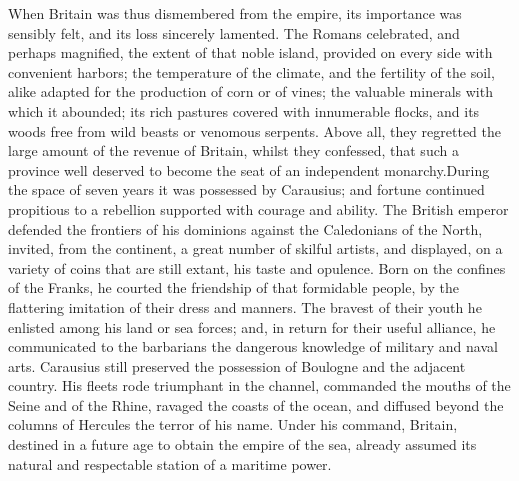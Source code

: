 
When Britain was thus dismembered from the empire, its importance
was sensibly felt, and its loss sincerely lamented. The Romans
celebrated, and perhaps magnified, the extent of that noble
island, provided on every side with convenient harbors; the
temperature of the climate, and the fertility of the soil, alike
adapted for the production of corn or of vines; the valuable
minerals with which it abounded; its rich pastures covered with
innumerable flocks, and its woods free from wild beasts or
venomous serpents. Above all, they regretted the large amount of
the revenue of Britain, whilst they confessed, that such a
province well deserved to become the seat of an independent
monarchy.\footnotemark[27] During the space of seven years it was possessed by
Carausius; and fortune continued propitious to a rebellion
supported with courage and ability. The British emperor defended
the frontiers of his dominions against the Caledonians of the
North, invited, from the continent, a great number of skilful
artists, and displayed, on a variety of coins that are still
extant, his taste and opulence. Born on the confines of the
Franks, he courted the friendship of that formidable people, by
the flattering imitation of their dress and manners. The bravest
of their youth he enlisted among his land or sea forces; and, in
return for their useful alliance, he communicated to the
barbarians the dangerous knowledge of military and naval arts.
Carausius still preserved the possession of Boulogne and the
adjacent country. His fleets rode triumphant in the channel,
commanded the mouths of the Seine and of the Rhine, ravaged the
coasts of the ocean, and diffused beyond the columns of Hercules
the terror of his name. Under his command, Britain, destined in a
future age to obtain the empire of the sea, already assumed its
natural and respectable station of a maritime power.\footnotemark[28]



